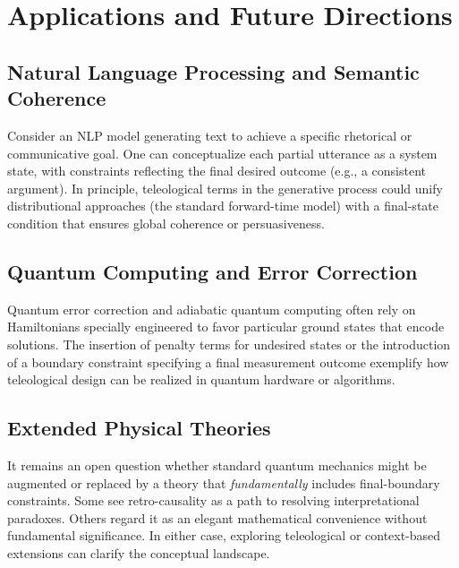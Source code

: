 \documentclass[11pt]{article}
\begin{document}
\section{Applications and Future Directions}
\subsection{Natural Language Processing and Semantic Coherence}
Consider an NLP model generating text to achieve a specific rhetorical or communicative goal. One can conceptualize each partial utterance as a system state, with constraints reflecting the final desired outcome (e.g., a consistent argument). In principle, teleological terms in the generative process could unify distributional approaches (the standard forward-time model) with a final-state condition that ensures global coherence or persuasiveness.

\subsection{Quantum Computing and Error Correction}
Quantum error correction \cite{Shor1997} and adiabatic quantum computing \cite{Farhi2000} often rely on Hamiltonians specially engineered to favor particular ground states that encode solutions. The insertion of penalty terms for undesired states or the introduction of a boundary constraint specifying a final measurement outcome exemplify how teleological design can be realized in quantum hardware or algorithms.

\subsection{Extended Physical Theories}
It remains an open question whether standard quantum mechanics might be augmented or replaced by a theory that \emph{fundamentally} includes final-boundary constraints. Some see retro-causality as a path to resolving interpretational paradoxes. Others regard it as an elegant mathematical convenience without fundamental significance. In either case, exploring teleological or context-based extensions can clarify the conceptual landscape.
\end{document}
